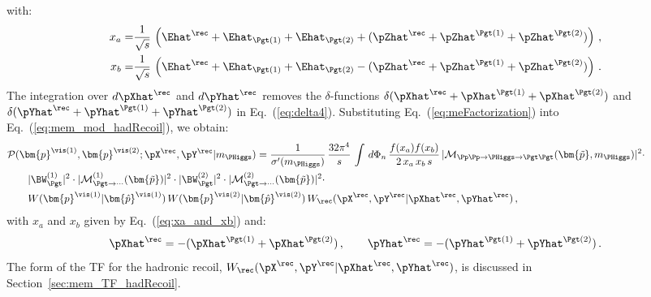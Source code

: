 with:
\begin{align}
x_{a} = & \frac{1}{\sqrt{s}} \, \left( \Ehat^{\rec} + \Ehat_{\Pgt(1)} +
\Ehat_{\Pgt(2)} + (\pZhat^{\rec} + \pZhat^{\Pgt(1)} +
\pZhat^{\Pgt(2)}) \right)
\, , \nonumber \\
x_{b} = & \frac{1}{\sqrt{s}} \, \left( \Ehat^{\rec} + \Ehat_{\Pgt(1)}
  + \Ehat_{\Pgt(2)} - (\pZhat^{\rec} + \pZhat^{\Pgt(1)} +
  \pZhat^{\Pgt(2)}) \right) \, .
\label{eq:xa_and_xb}
\end{align}
The integration over $d\pXhat^{\rec}$ and $d\pYhat^{\rec}$ removes the $\delta$-functions 
$\delta( \pXhat^{\rec} + \pXhat^{\Pgt(1)} + \pXhat^{\Pgt(2)} )$ and
$\delta( \pYhat^{\rec} + \pYhat^{\Pgt(1)} + \pYhat^{\Pgt(2)} )$ in Eq.~(\ref{eq:delta4}).
Substituting Eq.~(\ref{eq:meFactorization}) into Eq.~(\ref{eq:mem_mod_hadRecoil}), we obtain:
\begin{align}
&
\mathcal{P}(\bm{p}^{\vis(1)},\bm{p}^{\vis(2)};\pX^{\rec},\pY^{\rec}|m_{\PHiggs})
= \frac{1}{\sigma'(m_{\PHiggs})} \, \frac{32\pi^{4}}{s} \, \int \,
 d\Phi_{n} \, \frac{f(x_{a}) f(x_{b})}{2 \, x_{a} \, x_{b} \, s} \, 
 \vert \mathcal{M}_{\Pp\Pp \to \PHiggs \to \Pgt\Pgt}(\bm{\tilde{p}},m_{\PHiggs}) \vert^{2} \cdot \hspace{2cm} \nonumber \\
& \qquad \vert \BW^{(1)}_{\Pgt} \vert^{2} \cdot \vert \mathcal{M}^{(1)}_{\Pgt\to\cdots}(\bm{\tilde{p}}) \vert^{2} 
 \cdot \vert \BW^{(2)}_{\Pgt} \vert^{2} \cdot \vert \mathcal{M}^{(2)}_{\Pgt\to\cdots}(\bm{\tilde{p}}) \vert^{2} \cdot \nonumber \\
& \qquad W(\bm{p}^{\vis(1)}|\bm{\hat{p}}^{\vis(1)}) \, W(\bm{p}^{\vis(2)}|\bm{\hat{p}}^{\vis(2)}) \, W_{\rec}( \pX^{\rec},\pY^{\rec} | \pXhat^{\rec},\pYhat^{\rec} ) \, ,
\label{eq:mem_with_hadRecoil}
\end{align}
with $x_{a}$ and $x_{b}$ given by Eq.~(\ref{eq:xa_and_xb}) and:
\begin{equation}
\pXhat^{\rec} = -(\pXhat^{\Pgt(1)} + \pXhat^{\Pgt(2)}) \, ,
\qquad \pYhat^{\rec} = -(\pYhat^{\Pgt(1)} + \pYhat^{\Pgt(2)}) \, .
\label{eq:xpXhat_and_pYhat}
\end{equation}
The form of the TF for the hadronic recoil, $W_{\rec}( \pX^{\rec},\pY^{\rec} | \pXhat^{\rec},\pYhat^{\rec} )$, is
discussed in Section~\ref{sec:mem_TF_hadRecoil}.

